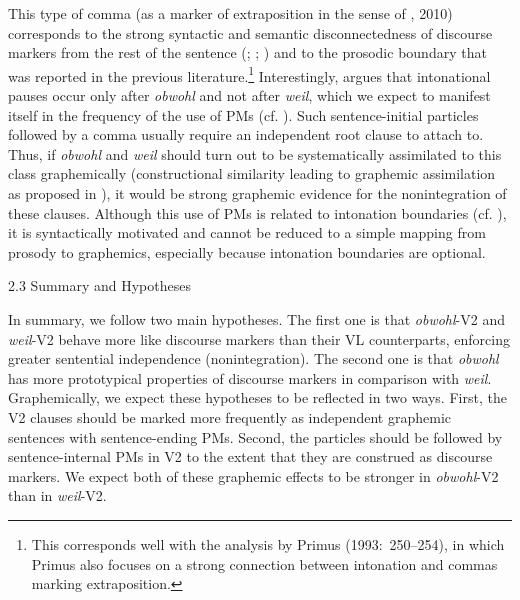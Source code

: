 \begin{styleMoutonText}
This type of comma (as a marker of extraposition in the sense of \citealt{Primus1993}, 2010) corresponds to the strong syntactic and semantic disconnectedness of discourse markers from the rest of the sentence (; \citealt{AuerGünthner2005}; \citealt{Breindl2009}) and to the prosodic boundary that was reported in the previous literature.\footnote{This corresponds well with the analysis by Primus (1993:~250–254), in which Primus also focuses on a strong connection between intonation and commas marking extraposition.} Interestingly, \citet{Breindl2009} argues that intonational pauses occur only after \textit{obwohl} and not after \textit{weil}, which we expect to manifest itself in the frequency of the use of PMs (cf. ). Such sentence-initial particles followed by a comma usually require an independent root clause to attach to. Thus, if \textit{obwohl} and \textit{weil} should turn out to be systematically assimilated to this class graphemically (constructional similarity leading to graphemic assimilation as proposed in ), it would be strong graphemic evidence for the nonintegration of these clauses. Although this use of PMs is related to intonation boundaries (cf. ), it is syntactically motivated and cannot be reduced to a simple mapping from prosody to graphemics, especially because intonation boundaries are optional.
\end{styleMoutonText}

\begin{styleMoutonHeadingii}
2.3  Summary and Hypotheses
\end{styleMoutonHeadingii}

\begin{styleMoutonText}
In summary, we follow two main hypotheses. The first one is that \textit{obwohl}{}-V2 and \textit{weil}{}-V2 behave more like discourse markers than their VL counterparts, enforcing greater sentential independence (nonintegration). The second one is that \textit{obwohl} has more prototypical properties of discourse markers in comparison with \textit{weil}. Graphemically, we expect these hypotheses to be reflected in two ways. First, the V2 clauses should be marked more frequently as independent graphemic sentences with sentence-ending PMs. Second, the particles should be followed by sentence-internal PMs in V2 to the extent that they are construed as discourse markers. We expect both of these graphemic effects to be stronger in \textit{obwohl}{}-V2 than in \textit{weil}{}-V2.
\end{styleMoutonText}

